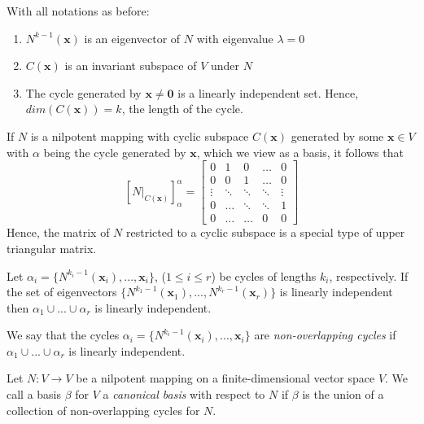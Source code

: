 \documentclass[12pt, a4paper, oneside, openright, titlepage]{book}
\newcommand{\mb}[1]{\mathbf{#1}}
\begin{document}
\begin{prop}
    With all notations as before:
    \begin{enumerate}
        \item $N^{k-1}(\mb x)$ is an eigenvector of $N$ with eigenvalue $\lambda = 0$
        \item $C(\mb x)$ is an invariant subspace of $V$ under $N$
        \item The cycle generated by $\mb x \neq \mb 0$ is a linearly independent set. Hence, $dim(C(\mb x)) = k$, the length of the cycle.
    \end{enumerate}
\end{prop}

\begin{obs}
    If $N$ is a nilpotent mapping with cyclic subspace $C(\mb x)$ generated by some $\mb x \in V$ with $\alpha$ being the cycle generated by $\mb x$, which we view as a basis, it follows that $$[N\rvert_{C(\mb x)}]_{\alpha}^{\alpha} = \begin{bmatrix} 0 & 1 & 0 & \hdots & 0 \\ 0 & 0 & 1 & \hdots & 0 \\ \vdots & \ddots & \ddots & \ddots & \vdots \\ 0 & \hdots & \ddots & \ddots & 1 \\ 0 & \hdots & \hdots & 0 & 0 \end{bmatrix}$$
    Hence, the matrix of $N$ restricted to a cyclic subspace is a special type of upper triangular matrix.
\end{obs}


\begin{prop}
    Let $\alpha_i = \{N^{k_i - 1}(\mb x_i),..., \mb x_i\}$, ($1 \leq i \leq r$) be cycles of lengths $k_i$, respectively. If the set of eigenvectors $\{N^{k_1-1}(\mb x_1),...,N^{k_r-1}(\mb x_r)\}$ is linearly independent then $\alpha_1 \cup ... \cup \alpha_r$ is linearly independent.
\end{prop}

\begin{defn}
    We say that the cycles $\alpha_i = \{N^{k_i - 1}(\mb x_i),..., \mb x_i\}$ are \emph{non-overlapping cycles} if $\alpha_1\cup ... \cup\alpha_r$ is linearly independent.
\end{defn}

\begin{defn}
    Let $N:V\rightarrow V$ be a nilpotent mapping on a finite-dimensional vector space $V$. We call a basis $\beta$ for $V$ a \emph{canonical basis} with respect to $N$ if $\beta$ is the union of a collection of non-overlapping cycles for $N$.
\end{defn}
\end{document}
